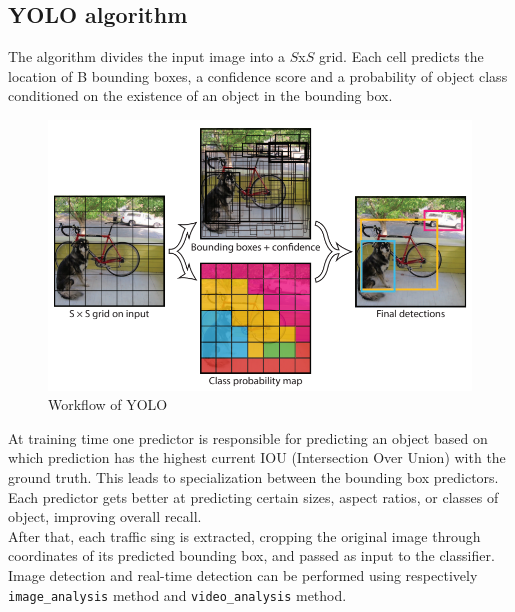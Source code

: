 \subsection{YOLO algorithm}
The algorithm divides the input image into a $S$x$S$ grid. Each cell predicts the location of B bounding boxes, a confidence score and a probability of object class conditioned on the existence of an object in the bounding box. 
\begin{figure}[h]
	\includegraphics[width=\linewidth]{Res/Immagini/yoloAlg.PNG}	
	\caption{Workflow of YOLO}
\end{figure}
At training time one predictor is responsible for predicting an object based on which prediction has the highest current IOU (Intersection Over Union) with the ground truth. This leads to specialization between the bounding box predictors. Each predictor gets better at predicting certain sizes, aspect ratios, or classes of object, improving overall recall.\\
After that, each traffic sing is extracted, cropping the original image through coordinates of its predicted bounding box, and passed as input to the classifier. Image detection and real-time detection can be performed using respectively \texttt{image\_analysis} method and \texttt{video\_analysis} method.

